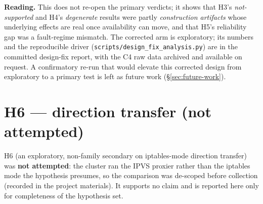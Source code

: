 \textbf{Reading.} This does not re-open the primary verdicts; it shows
that H3's \emph{not-supported} and H4's \emph{degenerate} results were partly
\emph{construction artifacts} whose underlying effects are real once availability
can move, and that H5's reliability gap was a fault-regime mismatch. The corrected
arm is exploratory; its numbers and the reproducible driver
(\texttt{scripts/design\_fix\_analysis.py}) are in the committed design-fix report,
with the C4 raw data archived and available on request. A
confirmatory re-run that would elevate this corrected design from exploratory to
a primary test is left as future work (\S\ref{sec:future-work}).

\section{H6 --- direction transfer (not attempted)}\label{sec:h6}

H6 (an exploratory, non-family secondary on iptables-mode direction transfer)
was \textbf{not attempted}: the cluster ran the IPVS proxier rather than the
iptables mode the hypothesis presumes, so the comparison was de-scoped before
collection (recorded in the project materials). It supports no claim and is
reported here only for completeness of the hypothesis set.
